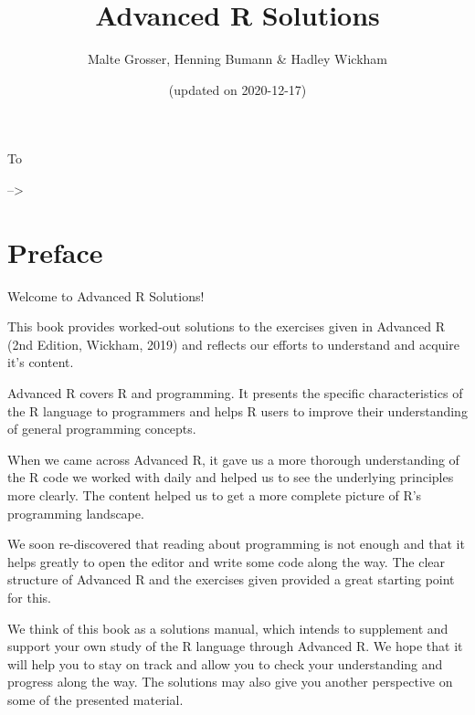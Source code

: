 \documentclass[
]{krantz}
\title{Advanced R Solutions}
\author{Malte Grosser, Henning Bumann \& Hadley Wickham}
\date{(updated on 2020-12-17)}
\begin{document}
\maketitle


\thispagestyle{empty}

\begin{center}
To %


\end{center}

\setlength{\abovedisplayskip}{-5pt}
\setlength{\abovedisplayshortskip}{-5pt}

{
\setcounter{tocdepth}{1}
\tableofcontents
}
--\textgreater{}

\mainmatter

\hypertarget{preface}{%
\chapter{Preface}\label{preface}}

Welcome to Advanced R Solutions!

This book provides worked-out solutions to the exercises given in Advanced R (2nd Edition, Wickham, 2019) and reflects our efforts to understand and acquire it's content.

Advanced R covers R and programming. It presents the specific characteristics of the R language to programmers and helps R users to improve their understanding of general programming concepts.

When we came across Advanced R, it gave us a more thorough understanding of the R code we worked with daily and helped us to see the underlying principles more clearly. The content helped us to get a more complete picture of R's programming landscape.

We soon re-discovered that reading about programming is not enough and that it helps greatly to open the editor and write some code along the way. The clear structure of Advanced R and the exercises given provided a great starting point for this.

We think of this book as a solutions manual, which intends to supplement and support your own study of the R language through Advanced R. We hope that it will help you to stay on track and allow you to check your understanding and progress along the way. The solutions may also give you another perspective on some of the presented material.
\end{document}
